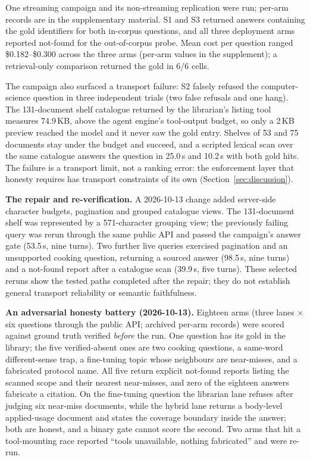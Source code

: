 One streaming campaign and its non-streaming replication were run; per-arm
records are in the supplementary material. S1 and S3 returned answers
containing the gold identifiers for both in-corpus questions, and all three
deployment arms reported not-found for the out-of-corpus probe. Mean cost per
question ranged \$0.182--\$0.300 across the three arms (per-arm values in the
supplement); a retrieval-only comparison returned the gold in 6/6 cells.

The campaign also surfaced a transport failure: S2 falsely refused the
computer-science question in three independent trials (two false refusals and
one hang). The 131-document shelf catalogue returned by the librarian's listing
tool measures 74.9\,KB, above the agent engine's tool-output budget, so only a
2\,KB preview reached the model and it never saw the gold entry. Shelves of 53
and 75 documents stay under the budget and succeed, and a scripted lexical
scan over the same catalogue answers the question in 25.0\,s and 10.2\,s with
both gold hits. The failure is a transport limit, not a ranking error: the
enforcement layer that honesty requires has transport constraints of its own
(Section~\ref{sec:discussion}).

\textbf{The repair and re-verification.} A 2026-10-13 change added
server-side character budgets, pagination and grouped catalogue views. The
131-document shelf was represented by a 571-character grouping view; the
previously failing query was rerun through the same public API and passed the
campaign's answer gate (53.5\,s, nine turns). Two further live queries
exercised pagination and an unsupported cooking question, returning a sourced
answer (98.5\,s, nine turns) and a not-found report after a catalogue scan
(39.9\,s, five turns).
These selected reruns show the tested paths completed after the repair; they do
not establish general transport reliability or semantic faithfulness.

\textbf{An adversarial honesty battery (2026-10-13).} Eighteen arms (three
lanes $\times$ six questions through the public API; archived per-arm records)
were scored against ground truth verified \emph{before} the run. One question
has its gold in the library; the five verified-absent ones are two cooking
questions, a same-word different-sense trap, a fine-tuning topic whose
neighbours are near-misses, and a fabricated protocol name. All five return
explicit not-found reports listing the scanned scope and their nearest
near-misses, and zero of the eighteen answers fabricate a citation. On the
fine-tuning question the librarian lane refuses after judging six near-miss
documents, while the hybrid lane returns a body-level applied-usage document
and states the coverage boundary inside the answer; both are honest, and a
binary gate cannot score the second. Two arms that hit a tool-mounting race
reported ``tools unavailable, nothing fabricated'' and were re-run.

